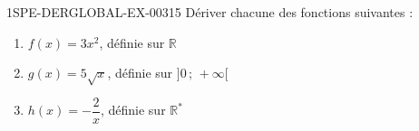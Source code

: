 \begin{exercice}{1SPE-DERGLOBAL-EX-003}{1}{5}
Dériver chacune des fonctions suivantes :
\begin{enumerate}
  \item $f(x) = 3x^2$, définie sur $\mathbb{R}$
  \item $g(x) = 5\sqrt{x}$, définie sur $]0\,;\,+\infty[$
  \item $h(x) = -\dfrac{2}{x}$, définie sur $\mathbb{R}^*$
\end{enumerate}
\end{exercice}

